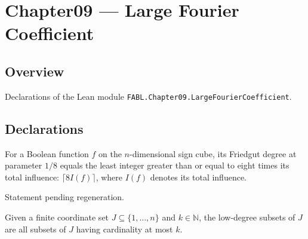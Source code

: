 \chapter{Chapter09 — Large Fourier Coefficient}
\section{Overview}

Declarations of the Lean module \texttt{FABL.Chapter09.LargeFourierCoefficient}.

\section{Declarations}

\begin{theorem}
\label{FABL.friedgutDegree_one_eighth}
\leanok
{}
For a Boolean function $f$ on the $n$-dimensional sign cube, its Friedgut degree at
parameter $1/8$ equals the least integer greater than or equal to eight times its total
influence: $\lceil 8 I(f)\rceil$, where $I(f)$ denotes its total influence.
\end{theorem}

\begin{theorem}
\label{FABL.card_friedgutCoordinates_one_eighth_le}
\leanok
{}
Statement pending regeneration.
\end{theorem}

\begin{definition}
\label{FABL.lowDegreeSubsets}
\leanok
Given a finite coordinate set $J\subseteq\{1,\ldots,n\}$ and $k\in\mathbb N$, the
low-degree subsets of $J$ are all subsets of $J$ having cardinality at most $k$.
\end{definition}

